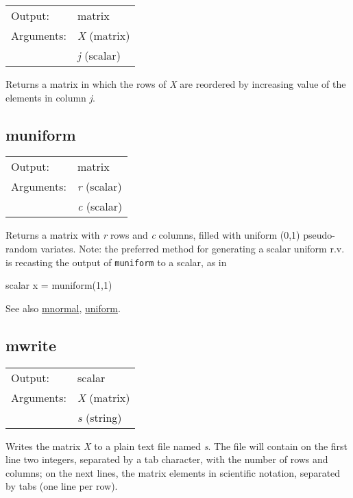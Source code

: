 \begin{tabular}{ll}
Output:     & matrix\\
Arguments:  & \textsl{X} (matrix)\\
           & \textsl{j} (scalar)\\
\end{tabular}

	  Returns a matrix in which the rows of \textsl{X}
	  are reordered by increasing value of the elements in
	  column \textsl{j}.

\subsection{muniform}
\hypertarget{func-muniform}{}

\begin{tabular}{ll}
Output:     & matrix\\
Arguments:  & \textsl{r} (scalar)\\
           & \textsl{c} (scalar)\\
\end{tabular}

	  Returns a matrix with \textsl{r} rows and
	  \textsl{c} columns, filled with uniform (0,1)
	  pseudo-random variates. Note: the preferred method for
	  generating a scalar uniform r.v. is recasting the output of
	  \texttt{muniform} to a scalar, as in 

\begin{code}
	  scalar x = muniform(1,1)

\end{code}

	  See also \hyperlink{func-mnormal}{mnormal}, \hyperlink{func-uniform}{uniform}.

\subsection{mwrite}
\hypertarget{func-mwrite}{}

\begin{tabular}{ll}
Output:     & scalar\\
Arguments:  & \textsl{X} (matrix)\\
           & \textsl{s} (string)\\
\end{tabular}

	  Writes the matrix \textsl{X} to a plain text file
	  named \textsl{s}. The file will contain on the first
	  line two integers, separated by a tab character, with the number
	  of rows and columns; on the next lines, the matrix elements in
	  scientific notation, separated by tabs (one line per row).

